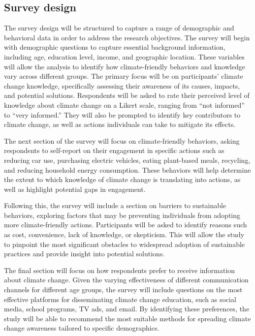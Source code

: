 \documentclass[
  letterpaper,
  DIV=11,
  numbers=noendperiod]{scrartcl}
\begin{document}
\subsection{Survey design}\label{survey-design}

The survey design will be structured to capture a range of demographic
and behavioral data in order to address the research objectives. The
survey will begin with demographic questions to capture essential
background information, including age, education level, income, and
geographic location. These variables will allow the analysis to identify
how climate-friendly behaviors and knowledge vary across different
groups. The primary focus will be on participants' climate change
knowledge, specifically assessing their awareness of its causes,
impacts, and potential solutions. Respondents will be asked to rate
their perceived level of knowledge about climate change on a Likert
scale, ranging from ``not informed'' to ``very informed.'' They will
also be prompted to identify key contributors to climate change, as well
as actions individuals can take to mitigate its effects.

The next section of the survey will focus on climate-friendly behaviors,
asking respondents to self-report on their engagement in specific
actions such as reducing car use, purchasing electric vehicles, eating
plant-based meals, recycling, and reducing household energy consumption.
These behaviors will help determine the extent to which knowledge of
climate change is translating into actions, as well as highlight
potential gaps in engagement.

Following this, the survey will include a section on barriers to
sustainable behaviors, exploring factors that may be preventing
individuals from adopting more climate-friendly actions. Participants
will be asked to identify reasons such as cost, convenience, lack of
knowledge, or skepticism. This will allow the study to pinpoint the most
significant obstacles to widespread adoption of sustainable practices
and provide insight into potential solutions.

The final section will focus on how respondents prefer to receive
information about climate change. Given the varying effectiveness of
different communication channels for different age groups, the survey
will include questions on the most effective platforms for disseminating
climate change education, such as social media, school programs, TV ads,
and email. By identifying these preferences, the study will be able to
recommend the most suitable methods for spreading climate change
awareness tailored to specific demographics.
\end{document}
